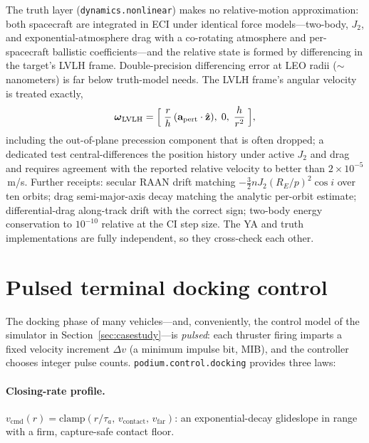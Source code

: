 \documentclass[11pt]{article}
\begin{document}
The truth layer (\texttt{dynamics.nonlinear}) makes no relative-motion
approximation: both spacecraft are integrated in ECI under identical force
models---two-body, $J_2$, and exponential-atmosphere drag with a co-rotating
atmosphere and per-spacecraft ballistic coefficients---and the relative
state is formed by differencing in the target's LVLH frame. Double-precision
differencing error at LEO radii ($\sim$nanometers) is far below truth-model
needs. The LVLH frame's angular velocity is treated exactly,
\begin{equation}
\boldsymbol\omega_{\mathrm{LVLH}} =
\Bigl[\; \frac{r}{h}\,(\mathbf a_{\mathrm{pert}}\cdot\hat{\mathbf z}),\;
0,\; \frac{h}{r^2} \;\Bigr],
\end{equation}
including the out-of-plane precession component that is often dropped;
a dedicated test central-differences the position history under active
$J_2$ and drag and requires agreement with the reported relative velocity
to better than $2\times10^{-5}$\,m/s. Further receipts: secular RAAN drift
matching $-\tfrac{3}{2}nJ_2(R_E/p)^2\cos i$ over ten orbits; drag
semi-major-axis decay matching the analytic per-orbit estimate;
differential-drag along-track drift with the correct sign; two-body energy
conservation to $10^{-10}$ relative at the CI step size. The YA and truth
implementations are fully independent, so they cross-check each other.

\section{Pulsed terminal docking control}
\label{sec:docking}

The docking phase of many vehicles---and, conveniently, the control model
of the simulator in Section~\ref{sec:casestudy}---is \emph{pulsed}: each
thruster firing imparts a fixed velocity increment $\Delta v$ (a minimum
impulse bit, MIB), and the controller chooses integer pulse counts.
\texttt{podium.control.docking} provides three laws:

\paragraph{Closing-rate profile.} $v_{\mathrm{cmd}}(r) =
\mathrm{clamp}(r/\tau_a,\, v_{\mathrm{contact}},\, v_{\mathrm{far}})$: an
exponential-decay glideslope in range with a firm, capture-safe contact
floor.
\end{document}

